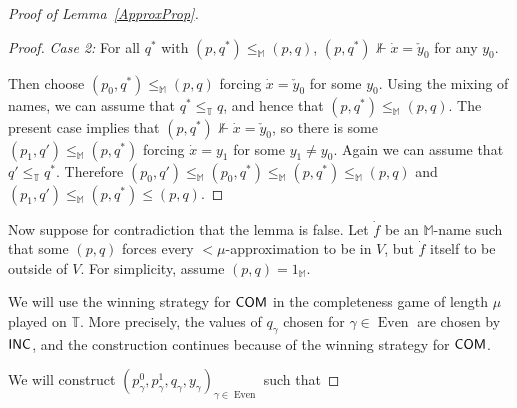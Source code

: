 \documentclass[a4paper]{amsart}
\theoremstyle{definition}
\theoremstyle{remark}
\theoremstyle{plain}
\numberwithin{mydef}{section}
\DeclareMathOperator{\Even}{Even}
\newcommand{\dM}{\mathbb{M}}
\newcommand{\dT}{\mathbb{T}}
\newcommand{\COM}{\textsf{\textup{COM}}}
\newcommand{\INC}{\textsf{\textup{INC}}}
\begin{document}
\begin{proof}[Proof of Lemma~\ref{ApproxProp}]
\begin{proof}
\emph{Case 2:} For all $q^*$ with $(p,q^*)\le_{\dM}(p,q)$, $(p,q^*)\not\Vdash\dot{x}=\check{y}_0$ for any $y_0$. 

Then choose $(p_0,q^*) \le_{\dM} (p,q)$ forcing $\dot{x}=\check{y}_0$ for some $y_0$. Using the mixing of names, we can assume that $q^* \le_{\dT} q$, and hence that $(p,q^*) \le_{\dM} (p,q)$. The present case implies that $(p,q^*) \not\Vdash\dot{x}=\check{y}_0$, so there is some $(p_1,q') \le_{\dM} (p,q^*)$ forcing $\dot{x}=y_1$ for some $y_1 \ne y_0$. Again we can assume that $q' \le_{\dT} q^*$. Therefore $(p_0,q') \le_{\dM} (p_0,q^*) \le_{\dM} (p,q^*) \le_{\dM} (p,q)$ and $(p_1,q') \le_{\dM} (p,q^*) \le (p,q)$.\end{proof}	
	
%
%
%
%	
	
	
		Now suppose for contradiction that the lemma is false. Let $\dot{f}$ be an $\dM$-name such that some $(p,q)$ forces every $<\mu$-approximation to be in $V$, but $\dot{f}$ itself to be outside of $V$. For simplicity, assume $(p,q)=1_{\dM}$.
		
	We will use the winning strategy for $\COM$ in the completeness game of length $\mu$ played on $\dT$. More precisely, the values of $q_\gamma$ chosen for $\gamma \in \Even$ are chosen by $\INC$, and the construction continues because of the winning strategy for $\COM$.
	
	We will construct $(p_{\gamma}^0,p_{\gamma}^1,q_\gamma,y_{\gamma})_{\gamma\in\Even}$ such that
	

\end{proof}
\end{document}
